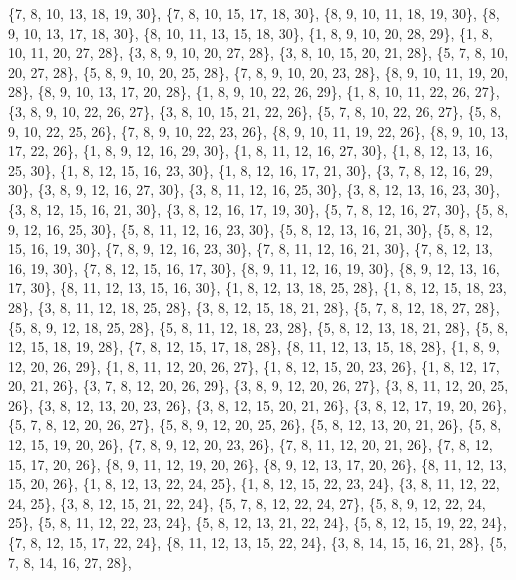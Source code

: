 \documentclass[11pt,a4paper]{article}
\begin{document}
{\{7, 8, 10, 13, 18, 19, 30\}, \{7, 8, 10, 15, 17, 18, 30\}, \{8, 9, 10, 11, 18, 19, 30\}, \{8, 9, 10, 13, 17, 18, 30\}, \{8, 10, 11, 13, 15, 18, 30\},
\{1, 8, 9, 10, 20, 28, 29\}, \{1, 8, 10, 11, 20, 27, 28\}, \{3, 8, 9, 10, 20, 27, 28\}, \{3, 8, 10, 15, 20, 21, 28\}, \{5, 7, 8, 10, 20, 27, 28\},
\{5, 8, 9, 10, 20, 25, 28\}, \{7, 8, 9, 10, 20, 23, 28\}, \{8, 9, 10, 11, 19, 20, 28\}, \{8, 9, 10, 13, 17, 20, 28\}, \{1, 8, 9, 10, 22, 26, 29\},
\{1, 8, 10, 11, 22, 26, 27\}, \{3, 8, 9, 10, 22, 26, 27\}, \{3, 8, 10, 15, 21, 22, 26\}, \{5, 7, 8, 10, 22, 26, 27\}, \{5, 8, 9, 10, 22, 25, 26\},
\{7, 8, 9, 10, 22, 23, 26\}, \{8, 9, 10, 11, 19, 22, 26\}, \{8, 9, 10, 13, 17, 22, 26\}, \{1, 8, 9, 12, 16, 29, 30\}, \{1, 8, 11, 12, 16, 27, 30\},
\{1, 8, 12, 13, 16, 25, 30\}, \{1, 8, 12, 15, 16, 23, 30\}, \{1, 8, 12, 16, 17, 21, 30\}, \{3, 7, 8, 12, 16, 29, 30\}, \{3, 8, 9, 12, 16, 27, 30\},
\{3, 8, 11, 12, 16, 25, 30\}, \{3, 8, 12, 13, 16, 23, 30\}, \{3, 8, 12, 15, 16, 21, 30\}, \{3, 8, 12, 16, 17, 19, 30\}, \{5, 7, 8, 12, 16, 27, 30\},
\{5, 8, 9, 12, 16, 25, 30\}, \{5, 8, 11, 12, 16, 23, 30\}, \{5, 8, 12, 13, 16, 21, 30\}, \{5, 8, 12, 15, 16, 19, 30\}, \{7, 8, 9, 12, 16, 23, 30\},
\{7, 8, 11, 12, 16, 21, 30\}, \{7, 8, 12, 13, 16, 19, 30\}, \{7, 8, 12, 15, 16, 17, 30\}, \{8, 9, 11, 12, 16, 19, 30\}, \{8, 9, 12, 13, 16, 17, 30\},
\{8, 11, 12, 13, 15, 16, 30\}, \{1, 8, 12, 13, 18, 25, 28\}, \{1, 8, 12, 15, 18, 23, 28\}, \{3, 8, 11, 12, 18, 25, 28\}, \{3, 8, 12, 15, 18, 21, 28\},
\{5, 7, 8, 12, 18, 27, 28\}, \{5, 8, 9, 12, 18, 25, 28\}, \{5, 8, 11, 12, 18, 23, 28\}, \{5, 8, 12, 13, 18, 21, 28\}, \{5, 8, 12, 15, 18, 19, 28\},
\{7, 8, 12, 15, 17, 18, 28\}, \{8, 11, 12, 13, 15, 18, 28\}, \{1, 8, 9, 12, 20, 26, 29\}, \{1, 8, 11, 12, 20, 26, 27\}, \{1, 8, 12, 15, 20, 23, 26\},
\{1, 8, 12, 17, 20, 21, 26\}, \{3, 7, 8, 12, 20, 26, 29\}, \{3, 8, 9, 12, 20, 26, 27\}, \{3, 8, 11, 12, 20, 25, 26\}, \{3, 8, 12, 13, 20, 23, 26\},
\{3, 8, 12, 15, 20, 21, 26\}, \{3, 8, 12, 17, 19, 20, 26\}, \{5, 7, 8, 12, 20, 26, 27\}, \{5, 8, 9, 12, 20, 25, 26\}, \{5, 8, 12, 13, 20, 21, 26\},
\{5, 8, 12, 15, 19, 20, 26\}, \{7, 8, 9, 12, 20, 23, 26\}, \{7, 8, 11, 12, 20, 21, 26\}, \{7, 8, 12, 15, 17, 20, 26\}, \{8, 9, 11, 12, 19, 20, 26\},
\{8, 9, 12, 13, 17, 20, 26\}, \{8, 11, 12, 13, 15, 20, 26\}, \{1, 8, 12, 13, 22, 24, 25\}, \{1, 8, 12, 15, 22, 23, 24\}, \{3, 8, 11, 12, 22, 24, 25\},
\{3, 8, 12, 15, 21, 22, 24\}, \{5, 7, 8, 12, 22, 24, 27\}, \{5, 8, 9, 12, 22, 24, 25\}, \{5, 8, 11, 12, 22, 23, 24\}, \{5, 8, 12, 13, 21, 22, 24\},
\{5, 8, 12, 15, 19, 22, 24\}, \{7, 8, 12, 15, 17, 22, 24\}, \{8, 11, 12, 13, 15, 22, 24\}, \{3, 8, 14, 15, 16, 21, 28\}, \{5, 7, 8, 14, 16, 27, 28\},
}
\end{document}

